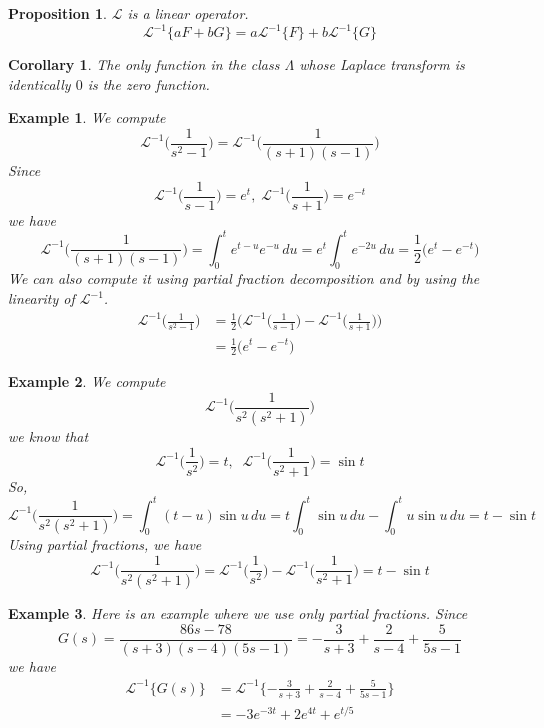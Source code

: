 \documentclass{article}
\newtheorem{proposition}[theorem]{Proposition}
\newtheorem{example}{Example}[section]
\newtheorem{corollary}{Corollary}[theorem]
\theoremstyle{remark}
\theoremstyle{definition}
\begin{document}
\begin{proposition}
$\mathcal{L}$ is a linear operator. 
\[\mathcal{L}^{-1} \{ a F + b G\} = a \mathcal{L}^{-1} \{F\} + b \mathcal{L}^{-1} \{G\}\]
\end{proposition}

\begin{corollary}
The only function in the class $\Lambda$ whose Laplace transform is identically $0$ is the zero function. 
\end{corollary}

\begin{example}
We compute 
\[\mathcal{L}^{-1} \bigg( \frac{1}{s^2 -1}\bigg) =\mathcal{L}^{-1} \bigg( \frac{1}{(s+1)(s-1)}\bigg)\]
Since 
\[\mathcal{L}^{-1} \bigg(\frac{1}{s-1}\bigg) = e^t, \; \mathcal{L}^{-1}\bigg(\frac{1}{s+1}\bigg) = e^{-t}\]
we have
\[\mathcal{L}^{-1} \bigg(\frac{1}{(s+1)(s-1)}\bigg) = \int_0^t e^{t-u} e^{-u} \,du = e^t \int_0^t e^{-2u} \,du = \frac{1}{2} \big(e^t - e^{-t}\big)\]
We can also compute it using partial fraction decomposition and by using the linearity of $\mathcal{L}^{-1}$. 
\begin{align*}
    \mathcal{L}^{-1} \bigg( \frac{1}{s^2-1}\bigg) & = \frac{1}{2} \Bigg( \mathcal{L}^{-1} \bigg( \frac{1}{s-1} \bigg) - \mathcal{L}^{-1} \bigg(\frac{1}{s+1}\bigg) \Bigg) \\
    & = \frac{1}{2} \big( e^t - e^{-t} \big) 
\end{align*}
\end{example}

\begin{example}
We compute 
\[\mathcal{L}^{-1} \bigg( \frac{1}{s^2(s^2 + 1)}\bigg)\]
we know that
\[\mathcal{L}^{-1} \bigg(\frac{1}{s^2}\bigg) = t, \;\; \mathcal{L}^{-1} \bigg( \frac{1}{s^2+1}\bigg) = \sin{t}\]
So,
\[\mathcal{L}^{-1} \bigg( \frac{1}{s^2 (s^2+1)}\bigg) = \int_0^t (t-u) \sin{u} \,du = t \int_0^t \sin{u}\,du - \int_0^t u \sin{u}\,du = t - \sin{t}\]
Using partial fractions, we have
\[\mathcal{L}^{-1} \bigg(\frac{1}{s^2(s^2 + 1)} \bigg) = \mathcal{L}^{-1} \bigg( \frac{1}{s^2} \bigg) - \mathcal{L}^{-1} \bigg(\frac{1}{s^2 + 1} \bigg) = t - \sin{t}\]
\end{example}

\begin{example}
Here is an example where we use only partial fractions. Since
\[G(s) = \frac{86 s - 78}{(s+3) (s - 4) (5s - 1)} = -\frac{3}{s+3} + \frac{2}{s-4} + \frac{5}{5s-1}\]
we have 
\begin{align*}
    \mathcal{L}^{-1} \{G(s)\} & = \mathcal{L}^{-1} \{-\frac{3}{s+3} + \frac{2}{s-4} + \frac{5}{5s-1}\} \\
    & = -3 e^{-3t} + 2 e^{4 t} + e^{t/5}
\end{align*}
\end{example}
\end{document}
